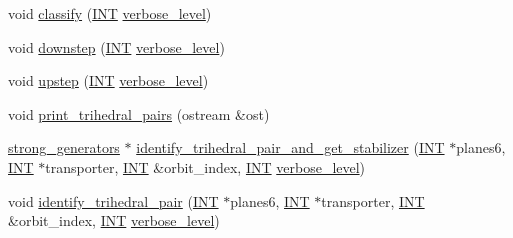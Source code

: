 \begin{DoxyCompactItemize}
\item 
void \mbox{\hyperlink{classclassify__trihedral__pairs_a134e4c3042163c24bf57050f26e364e1}{classify}} (\mbox{\hyperlink{galois_8h_a09fddde158a3a20bd2dcadb609de11dc}{I\+NT}} \mbox{\hyperlink{simeon_8_c_a818073fbcc2f439e7c56952f67386122}{verbose\+\_\+level}})
\item 
void \mbox{\hyperlink{classclassify__trihedral__pairs_a3fe3880b4f1451c976300cba97be0bbf}{downstep}} (\mbox{\hyperlink{galois_8h_a09fddde158a3a20bd2dcadb609de11dc}{I\+NT}} \mbox{\hyperlink{simeon_8_c_a818073fbcc2f439e7c56952f67386122}{verbose\+\_\+level}})
\item 
void \mbox{\hyperlink{classclassify__trihedral__pairs_a4134a82fca1d3962311921731ce001eb}{upstep}} (\mbox{\hyperlink{galois_8h_a09fddde158a3a20bd2dcadb609de11dc}{I\+NT}} \mbox{\hyperlink{simeon_8_c_a818073fbcc2f439e7c56952f67386122}{verbose\+\_\+level}})
\item 
void \mbox{\hyperlink{classclassify__trihedral__pairs_aec86c8ceec381ff968d6183c70eaab86}{print\+\_\+trihedral\+\_\+pairs}} (ostream \&ost)
\item 
\mbox{\hyperlink{classstrong__generators}{strong\+\_\+generators}} $\ast$ \mbox{\hyperlink{classclassify__trihedral__pairs_a433489bad83d619b71a688e6a03a3210}{identify\+\_\+trihedral\+\_\+pair\+\_\+and\+\_\+get\+\_\+stabilizer}} (\mbox{\hyperlink{galois_8h_a09fddde158a3a20bd2dcadb609de11dc}{I\+NT}} $\ast$planes6, \mbox{\hyperlink{galois_8h_a09fddde158a3a20bd2dcadb609de11dc}{I\+NT}} $\ast$transporter, \mbox{\hyperlink{galois_8h_a09fddde158a3a20bd2dcadb609de11dc}{I\+NT}} \&orbit\+\_\+index, \mbox{\hyperlink{galois_8h_a09fddde158a3a20bd2dcadb609de11dc}{I\+NT}} \mbox{\hyperlink{simeon_8_c_a818073fbcc2f439e7c56952f67386122}{verbose\+\_\+level}})
\item 
void \mbox{\hyperlink{classclassify__trihedral__pairs_a1a85f616b5043da9f7e585868b0d191d}{identify\+\_\+trihedral\+\_\+pair}} (\mbox{\hyperlink{galois_8h_a09fddde158a3a20bd2dcadb609de11dc}{I\+NT}} $\ast$planes6, \mbox{\hyperlink{galois_8h_a09fddde158a3a20bd2dcadb609de11dc}{I\+NT}} $\ast$transporter, \mbox{\hyperlink{galois_8h_a09fddde158a3a20bd2dcadb609de11dc}{I\+NT}} \&orbit\+\_\+index, \mbox{\hyperlink{galois_8h_a09fddde158a3a20bd2dcadb609de11dc}{I\+NT}} \mbox{\hyperlink{simeon_8_c_a818073fbcc2f439e7c56952f67386122}{verbose\+\_\+level}})
\end{DoxyCompactItemize}
